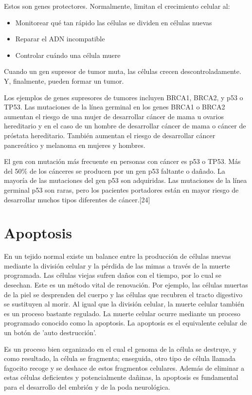 \hspace{.1cm}Estos son genes protectores. Normalmente, limitan el crecimiento celular al:
\begin{itemize}
    \item Monitorear qué tan rápido las células se dividen en células nuevas
    \item Reparar el ADN incompatible
    \item Controlar cuándo una célula muere
\end{itemize}
Cuando un gen supresor de tumor muta, las células crecen descontroladamente. Y, finalmente, pueden formar un tumor.

\hspace{.1cm}Los ejemplos de genes supresores de tumores incluyen BRCA1, BRCA2, y p53 o TP53. Las mutaciones de la línea germinal en los genes BRCA1 o BRCA2 aumentan el riesgo de una mujer de desarrollar cáncer de mama u ovarios hereditario y en el caso de un hombre de desarrollar cáncer de mama o cáncer de próstata hereditario. También aumentan el riesgo de desarrollar cáncer pancreático y melanoma en mujeres y hombres.

\hspace{.1cm}El gen con mutación más frecuente en personas con cáncer es p53 o TP53. Más del 50\% de los cánceres se producen por un gen p53 faltante o dañado. La mayoría de las mutaciones del gen p53 son adquiridas. Las mutaciones de la línea germinal p53 son raras, pero los pacientes portadores están en mayor riesgo de desarrollar muchos tipos diferentes de cáncer.[24]

\section{Apoptosis}
\hspace{.1cm}En un tejido normal existe un balance entre la producción de células nuevas mediante la división celular y la pérdida de las mimas a través de la muerte programada. Las células viejas sufren daños con el tiempo, por lo cual se desechan. Este es un método vital de renovación. Por ejemplo, las células muertas de la piel se desprenden del cuerpo y las células que recubren el tracto digestivo se sustituyen al morir. Al igual que la división celular, la muerte celular también es un proceso bastante regulado. La muerte celular ocurre mediante un proceso programado conocido como la apoptosis. La apoptosis es el equivalente celular de un botón de 'auto destrucción'.

\hspace{.1cm}Es un proceso bien organizado en el cual el genoma de la célula se destruye, y como resultado, la célula se fragmenta; enseguida, otro tipo de célula llamada fagocito recoge y se deshace de estos fragmentos celulares. Además de eliminar a estas células deficientes y potencialmente dañinas, la apoptosis es fundamental para el desarrollo del embrión y de la poda neurológica.

